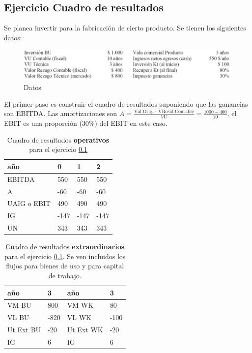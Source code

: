 \documentclass[twocolumn,10pt]{article}
\begin{document}
\subsection{Ejercicio Cuadro de resultados}\label{ej:inversion_planta_cuadro}

Se planea invertir para la fabricación de cierto producto. Se tienen los siguientes datos:
\begin{figure}[htb]
	\centering
	\includegraphics[width=0.95\linewidth]{fig/ejercicio_inversion_planta.png}
	\caption{Datos}
	\label{fig:ejercicio_inversion_planta}
\end{figure}

El primer paso es construir el cuadro de resultados suponiendo que las ganancias son EBITDA. Las amortizaciones son $A=\frac{\text{Val.Orig. - VResid.Contable}}{VU} = \frac{1000-400}{10}$, el EBIT es una proporción (30\%) del EBIT en este caso.

\begin{table}[htb!]
	\centering
	\caption{Cuadro de resultados \textbf{operativos} para el ejercicio \ref{ej:inversion_planta_cuadro}}
	\begin{tabular}{l|lll}
	\textbf{año} & \textbf{0} & \textbf{1} & \textbf{2} \\ \hline
	EBITDA       & 550        & 550        & 550        \\
	A            & -60        & -60        & -60        \\ \hline
	UAIG o EBIT         & 490        & 490        & 490        \\
	IG           & -147       & -147       & -147       \\ \hline
	UN           & 343        & 343        & 343       
	\end{tabular}
\end{table}

\begin{table}[htb]
	\centering
	\caption{Cuadro de resultados \textbf{extraordinarios} para el ejercicio \ref{ej:inversion_planta_cuadro}. Se ven incluidos los flujos para bienes de uso y para capital de trabajo.}
	\begin{tabular}{l|l||l|l}
	\textbf{año} & \textbf{3} & \textbf{año} & \textbf{3}\\ \hline
	VM BU        & 800    & VM WK  & 80 \\
	VL BU        & -820   & VL WK  & -100  \\ \hline
	Ut Ext BU    & -20    & Ut Ext WK & -20   \\
	IG           & 6      & IG  & 6  \\ \hline
	\end{tabular}
\end{table}
\end{document}
